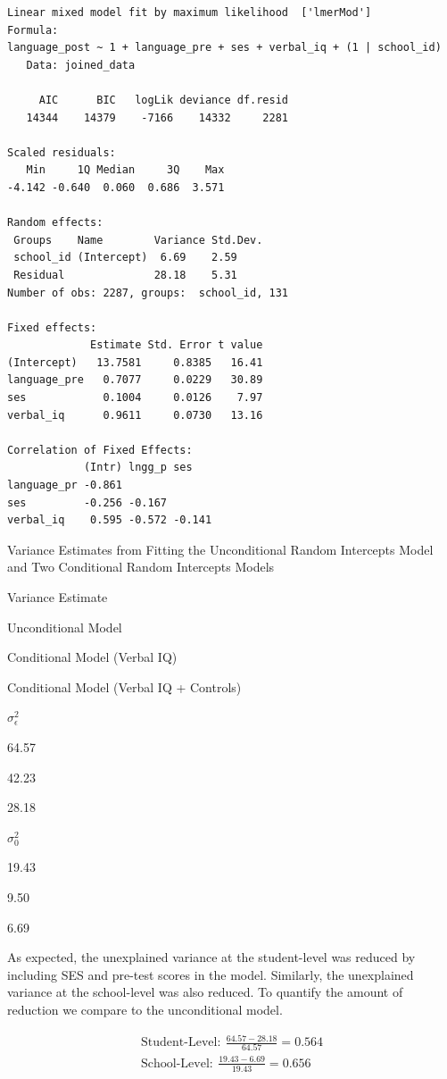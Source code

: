 \documentclass[]{book}
\begin{document}
\begin{verbatim}
Linear mixed model fit by maximum likelihood  ['lmerMod']
Formula: 
language_post ~ 1 + language_pre + ses + verbal_iq + (1 | school_id)
   Data: joined_data

     AIC      BIC   logLik deviance df.resid 
   14344    14379    -7166    14332     2281 

Scaled residuals: 
   Min     1Q Median     3Q    Max 
-4.142 -0.640  0.060  0.686  3.571 

Random effects:
 Groups    Name        Variance Std.Dev.
 school_id (Intercept)  6.69    2.59    
 Residual              28.18    5.31    
Number of obs: 2287, groups:  school_id, 131

Fixed effects:
             Estimate Std. Error t value
(Intercept)   13.7581     0.8385   16.41
language_pre   0.7077     0.0229   30.89
ses            0.1004     0.0126    7.97
verbal_iq      0.9611     0.0730   13.16

Correlation of Fixed Effects:
            (Intr) lngg_p ses   
language_pr -0.861              
ses         -0.256 -0.167       
verbal_iq    0.595 -0.572 -0.141
\end{verbatim}

\label{tab:unnamed-chunk-219}Variance Estimates from Fitting the Unconditional Random Intercepts Model and Two Conditional Random Intercepts Models

Variance Estimate

Unconditional Model

Conditional Model
(Verbal IQ)

Conditional Model
(Verbal IQ + Controls)

\(\sigma^2_{\epsilon}\)

64.57

42.23

28.18

\(\sigma^2_{0}\)

19.43

9.50

6.69

As expected, the unexplained variance at the student-level was reduced by including SES and pre-test scores in the model. Similarly, the unexplained variance at the school-level was also reduced. To quantify the amount of reduction we compare to the unconditional model.

\[
\begin{split}
\mathrm{Student\mbox{-}Level:~} \frac{64.57 - 28.18}{64.57} = 0.564 \\[1em]
\mathrm{School\mbox{-}Level:~} \frac{19.43 - 6.69}{19.43} = 0.656 \\
\end{split}
\]
\end{document}
